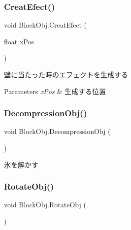 \subsubsection{\texorpdfstring{Creat\+Efect()}{CreatEfect()}}
{\footnotesize\ttfamily void Block\+Obj.\+Creat\+Efect (\begin{DoxyParamCaption}\item[{float}]{x\+Pos }\end{DoxyParamCaption})\hspace{0.3cm}{\ttfamily [inline]}}



壁に当たった時のエフェクトを生成する 


\begin{DoxyParams}{Parameters}
{\em x\+Pos} & 生成する位置\\
\hline
\end{DoxyParams}
\mbox{\label{class_block_obj_a87bfddc5f6ec30cdc03f4a68483550db}} 
\subsubsection{\texorpdfstring{Decompression\+Obj()}{DecompressionObj()}}
{\footnotesize\ttfamily void Block\+Obj.\+Decompression\+Obj (\begin{DoxyParamCaption}{ }\end{DoxyParamCaption})\hspace{0.3cm}{\ttfamily [inline]}}



氷を解かす 

\mbox{\label{class_block_obj_ae180e4e29771bf016cda61d51c832da0}} 
\subsubsection{\texorpdfstring{Rotate\+Obj()}{RotateObj()}}
{\footnotesize\ttfamily void Block\+Obj.\+Rotate\+Obj (\begin{DoxyParamCaption}{ }\end{DoxyParamCaption})\hspace{0.3cm}{\ttfamily [inline]}}



